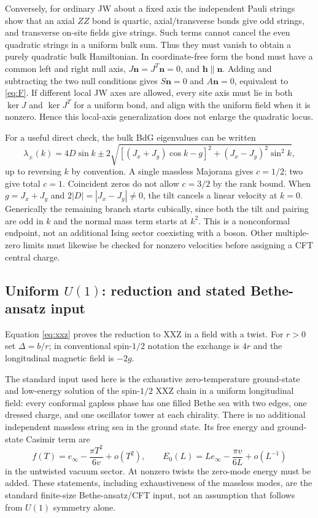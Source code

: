\documentclass[11pt]{article}
\newcommand{\nn}{\boldsymbol n}
\newcommand{\hh}{\boldsymbol h}
\begin{document}
Conversely, for ordinary JW about a fixed axis the independent Pauli strings
show that an axial $ZZ$ bond is quartic, axial/transverse bonds give odd
strings, and transverse on-site fields give strings. Such terms cannot
cancel the even quadratic strings in a uniform bulk sum. Thus they must
vanish to obtain a purely quadratic bulk Hamiltonian. In coordinate-free
form the bond must have a common left and right null axis,
$J\nn=J^T\nn=0$, and $\hh\parallel\nn$. Adding and subtracting the two null
conditions gives $S\nn=0$ and $A\nn=0$, equivalent to \eqref{eq:F}.
If different local JW axes are allowed, every site axis must lie in both
$\ker J$ and $\ker J^T$ for a uniform bond, and align with the uniform field
when it is nonzero. Hence this local-axis generalization does not enlarge
the quadratic locus.

For a useful direct check, the bulk BdG eigenvalues can be written
\begin{equation}
 \lambda_\pm(k)=4D\sin k\pm
 2\sqrt{[(J_x+J_y)\cos k-g]^2+(J_x-J_y)^2\sin^2 k},
 \label{eq:disp}
\end{equation}
up to reversing $k$ by convention. A single massless Majorana gives $c=1/2$;
two give total $c=1$. Coincident zeros do not allow $c=3/2$ by the rank bound.
When $g=J_x+J_y$ and $2|D|=|J_x-J_y|\ne0$, the tilt cancels a linear
velocity at $k=0$. Generically the remaining branch starts cubically,
since both the tilt and pairing are odd in $k$ and the normal mass term starts
at $k^2$. This is a nonconformal endpoint, not an additional Ising sector
coexisting with a boson. Other multiple-zero limits must likewise be checked
for nonzero velocities before assigning a CFT central charge.

\subsection{Uniform $U(1)$: reduction and stated Bethe-ansatz input}

Equation \eqref{eq:xxz} proves the reduction to XXZ in a field with a twist.
For $r>0$ set $\Delta=b/r$; in conventional spin-$1/2$ notation the exchange
is $4r$ and the longitudinal magnetic field is $-2g$.

The standard input used here is the exhaustive zero-temperature ground-state
and low-energy solution of the spin-$1/2$ XXZ chain in a uniform longitudinal
field: every conformal gapless phase has one filled Bethe sea with two edges,
one dressed charge, and one oscillator tower at each chirality. There is no
additional independent massless string sea in the ground state. Its free
energy and ground-state Casimir term are
\begin{equation}
 f(T)=e_\infty-\frac{\pi T^2}{6v}+o(T^2),\qquad
 E_0(L)=Le_\infty-\frac{\pi v}{6L}+o(L^{-1})
 \label{eq:BAc}
\end{equation}
in the untwisted vacuum sector. At nonzero twists the zero-mode energy must
be added. These statements, including exhaustiveness of the massless modes,
are the standard finite-size Bethe-ansatz/CFT input, not an assumption that
follows from $U(1)$ symmetry alone.
\end{document}
